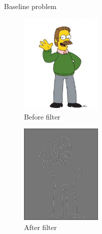 \documentclass[compress,10pt,aspectratio=169]{beamer}
\begin{document}
\begin{frame}[fragile]{Baseline problem}
\begin{multicols}{2}
\begin{minipage}{0.45\textwidth}
  \begin{figure}
    \includegraphics[width=0.35\textwidth]{../Images/ned.png}
    \caption{\scriptsize Before filter}
  \end{figure}
\end{minipage}
\begin{minipage}{0.45\textwidth}
  \begin{figure}
    \includegraphics[width=0.35\textwidth]{../Images/lapl_ned.png}
    \caption{\scriptsize After filter}
  \end{figure}
\end{minipage}
\end{multicols}
\end{frame}
\end{document}
